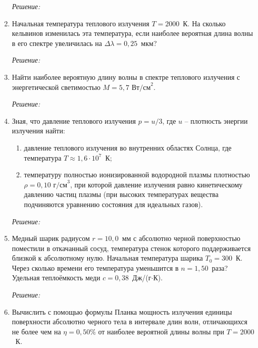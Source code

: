 \begin{enumerate}
\emph{Решение:}

\newpage

\item Начальная температура теплового излучения \( T = 2000 \)~К. На сколько
кельвинов изменилась эта температура, если наиболее вероятная длина волны в его
спектре увеличилась на \( \Delta\lambda = 0,\!25 \)~мкм?

\emph{Решение:}

\newpage

\item Найти наиболее вероятную длину волны в спектре теплового излучения с
энергетической светимостью \( M = 5,\!7\text{~Вт/см}^2 \).

\emph{Решение:}

\newpage

\item Зная, что давление теплового излучения \( p = u/3 \), где \( u \) --
плотность энергии излучения найти:
\begin{enumerate}
    \item давление теплового излучения во внутренних областях Солнца, где
    температура \( T \approx 1,6\cdot 10^7 \)~К;
    \item температуру полностью ионизированной водородной плазмы плотностью
    \( \rho = 0,\!10\text{~г/см}^3 \), при которой давление излучения равно
    кинетическому давлению частиц плазмы (при высоких температурах вещества
    подчиняются уравнению состояния для идеальных газов).
\end{enumerate}

\emph{Решение:}

\newpage

\item Медный шарик радиусом \( r = 10,\!0 \)~мм с абсолютно черной поверхностью
поместили в откачанный сосуд, температура стенок которого поддерживается близкой
к абсолютному нулю. Начальная температура шарика \( T_0 = 300 \)~К. Через
сколько времени его температура уменьшится в \( n = 1,\!50 \)~раза? Удельная
теплоёмкость меди \( c = 0,\!38 \)~Дж/(г\( \cdot \)К).

\emph{Решение:}

\newpage

\item Вычислить с помощью формулы Планка мощность излучения единицы поверхности
абсолютно черного тела в интервале длин волн, отличающихся не более чем на
\( \eta = 0,\!50\% \) от наиболее вероятной длины волны при \( T = 2000 \)~К.


\end{enumerate}
